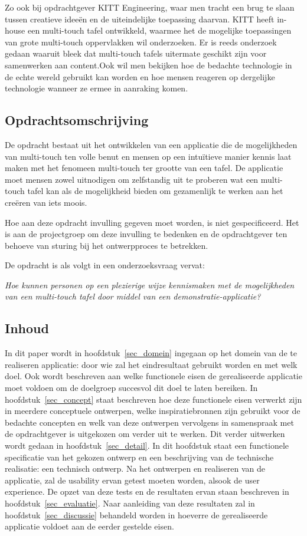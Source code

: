 \documentclass{acm}
\begin{document}
Zo ook bij opdrachtgever KITT Engineering, waar men tracht een brug te slaan tussen creatieve idee\"en en de uiteindelijke toepassing daarvan. KITT heeft in-house een multi-touch tafel ontwikkeld, waarmee het de mogelijke toepassingen van grote multi-touch oppervlakken wil onderzoeken. Er is reeds onderzoek gedaan waaruit bleek dat multi-touch tafels uitermate geschikt zijn voor samenwerken aan content.\cite{Shen}\cite{Ryall}Ook wil men bekijken hoe de bedachte technologie in de echte wereld gebruikt kan worden en hoe mensen reageren op dergelijke technologie wanneer ze ermee in aanraking komen.

\subsection{Opdrachtsomschrijving}
De opdracht bestaat uit het ontwikkelen van een applicatie die de mogelijkheden van multi-touch ten volle benut en mensen op een intu\"itieve manier kennis laat maken met het fenomeen multi-touch ter grootte van een tafel. De applicatie moet mensen zowel uitnodigen om zelfstandig uit te proberen wat een multi-touch tafel kan als de mogelijkheid bieden om gezamenlijk te werken aan het cre\"eren van iets moois.

Hoe aan deze opdracht invulling gegeven moet worden, is niet gespecificeerd. Het is aan de projectgroep om deze invulling te bedenken en de opdrachtgever ten behoeve van sturing bij het ontwerpproces te betrekken.

De opdracht is als volgt in een onderzoeksvraag vervat:

\textit{Hoe kunnen personen op een plezierige wijze kennismaken met de mogelijkheden van een multi-touch tafel door middel van een demonstratie-applicatie?}

\subsection{Inhoud}
In dit paper wordt in hoofdstuk~\ref{sec_domein} ingegaan op het domein van de te realiseren applicatie: door wie zal het eindresultaat gebruikt worden en met welk doel. Ook wordt beschreven aan welke functionele eisen de gerealiseerde applicatie moet voldoen om de doelgroep succesvol dit doel te laten bereiken. In hoofdstuk~\ref{sec_concept} staat beschreven hoe deze functionele eisen verwerkt zijn in meerdere conceptuele ontwerpen, welke inspiratiebronnen zijn gebruikt voor de bedachte concepten en welk van deze ontwerpen vervolgens in samenspraak met de opdrachtgever is uitgekozen om verder uit te werken. Dit verder uitwerken wordt gedaan in hoofdstuk~\ref{sec_detail}. In dit hoofdstuk staat een functionele specificatie van het gekozen ontwerp en een beschrijving van de technische realisatie: een technisch ontwerp.
\newpage
Na het ontwerpen en realiseren van de applicatie, zal de usability ervan getest moeten worden, alsook de user experience. De opzet van deze tests en de resultaten ervan staan beschreven in hoofdstuk~\ref{sec_evaluatie}. Naar aanleiding van deze resultaten zal in hoofdstuk~\ref{sec_discussie} behandeld worden in hoeverre de gerealiseerde applicatie voldoet aan de eerder gestelde eisen.
\end{document}
